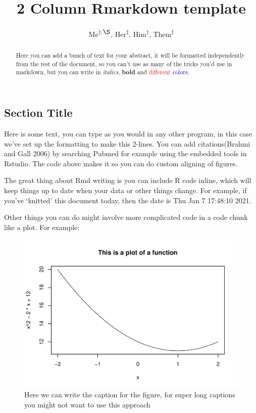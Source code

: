 \documentclass[
  twocolumn]{article}
\title{2 Column Rmarkdown template}
\author{Me\textsuperscript{\(\dagger\),\(\S\)},
Her\textsuperscript{\(\ddagger\)}, Him\textsuperscript{\(\dagger\)},
Them\textsuperscript{\(\ddagger\)}}
\date{}
\begin{document}
\maketitle
\begin{abstract}
Here you can add a bunch of text for your abstract, it will be formatted
independently from the rest of the document, so you can't use as many of
the tricks you'd use in markdown, but you can write in \textit{italics},
\textbf{bold} and \textcolor{red}{different} \textcolor{blue}{colors}.
\end{abstract}

\hypertarget{section-title}{%
\subsection{Section Title}\label{section-title}}

Here is some text, you can type as you would in any other program, in
this case we've set up the formatting to make this 2-lines. You can add
citations(Brahmi and Gall 2006) by searching Pubmed for example using
the embedded tools in Rstudio. The code above makes it so you can do
custom aligning of figures.

The great thing about Rmd writing is you can include R code inline,
which will keep things up to date when your data or other things change.
For example, if you've `knitted' this document today, then the date is
Thu Jan 7 17:48:10 2021.

Other things you can do might involve more complicated code in a code
chunk like a plot. For example:

\begin{figure}
\centering
\includegraphics{2_Col_template_files/figure-latex/unnamed-chunk-1-1.pdf}
\caption{Here we can write the caption for the figure, for super long
captions you might not want to use this approach}
\end{figure}
\end{document}
